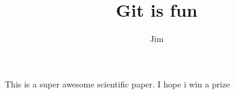 \documentclass[10pt]{article}
\author{Jim}
\title{Git is fun}
\begin{document}
  \maketitle

  This is a super awesome scientific paper.
  I hope i win a prize

  
\end{document}
